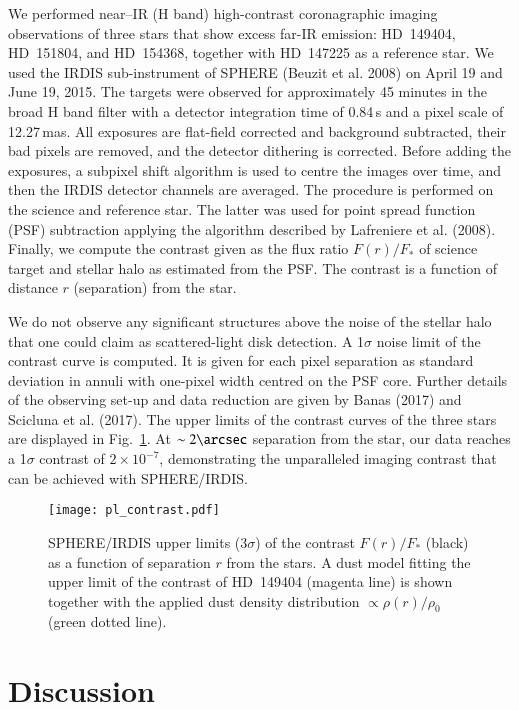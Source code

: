\documentclass[tradiabstract]{aa} %
\begin{document}
We performed near--IR (H band) high-contrast coronagraphic imaging
observations of three stars that show excess far-IR emission:
HD~149404, HD~151804, and HD~154368, together with { HD~147225 as a reference
  star}. We used the IRDIS sub-instrument of SPHERE (Beuzit et
al. 2008) on April 19 and June 19, 2015. { The targets were
  observed for approximately 45 minutes in the broad H band filter
  with a detector integration time of 0.84\,s and a pixel scale of
  12.27\,mas.} All exposures are flat-field corrected and background
subtracted, their bad pixels are removed, and the detector dithering is
corrected. Before adding the exposures, a subpixel shift algorithm is
used to centre the images over time, and then the { IRDIS detector
  channels} are averaged. The procedure is performed on the science
and reference star. The latter was used for point spread function
(PSF) subtraction applying the algorithm described by Lafreniere et
al. (2008). Finally, we compute the contrast given as the flux ratio
$F(r)/F_{*}$ of science target and stellar halo as estimated from the
PSF. The contrast is a function of distance $r$ (separation) from the
star.

We do not observe any significant structures above the noise of the
stellar halo that one could claim as scattered-light disk detection.
A 1$\sigma$ noise limit of the contrast curve is computed.  It is
given for each pixel separation as standard deviation in annuli with
one-pixel width centred on the PSF core.  Further details of the
observing set-up and data reduction are given by Banas (2017) and
Scicluna et al. (2017).  The upper limits of the contrast curves of
the three stars are displayed in Fig.~\ref{pl_contrast.fig}.  { At $\sim 2\arcsec$ separation from the star, our data reaches a 1$\sigma$
contrast of $2 \times 10^{-7}$,} demonstrating the unparalleled imaging
contrast that can be achieved with SPHERE/IRDIS.


\begin{figure} [h!tb]
\texttt{[image: pl\_contrast.pdf]}
\caption{SPHERE/IRDIS upper limits ($3\sigma$) of the contrast
  $F(r)/F_{*}$ (black) as a function of separation $r$ from the
  stars. A dust model fitting the upper limit of the contrast of
  HD~149404 (magenta line) is shown together with the applied dust
  density distribution $\propto \rho(r)/\rho_{0}$ (green dotted
  line). \label{pl_contrast.fig}}
\end{figure}


\section{Discussion}
\end{document}
